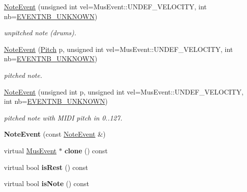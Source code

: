 \begin{DoxyCompactItemize}
\item 
\mbox{\hyperlink{group__segment_gaeeb3a0d391bef4a285f1be45d31e63be}{Note\+Event}} (unsigned int vel=Mus\+Event\+::\+U\+N\+D\+E\+F\+\_\+\+V\+E\+L\+O\+C\+I\+TY, int nb=\mbox{\hyperlink{group__general_gac3b19762b16f33de03662fd4289fe5a9}{E\+V\+E\+N\+T\+N\+B\+\_\+\+U\+N\+K\+N\+O\+WN}})
\begin{DoxyCompactList}\small\item\em unpitched note (drums). \end{DoxyCompactList}\item 
\mbox{\hyperlink{group__segment_ga1bd25b8699a9ed866f11f62a844645f7}{Note\+Event}} (\mbox{\hyperlink{classPitch}{Pitch}} p, unsigned int vel=Mus\+Event\+::\+U\+N\+D\+E\+F\+\_\+\+V\+E\+L\+O\+C\+I\+TY, int nb=\mbox{\hyperlink{group__general_gac3b19762b16f33de03662fd4289fe5a9}{E\+V\+E\+N\+T\+N\+B\+\_\+\+U\+N\+K\+N\+O\+WN}})
\begin{DoxyCompactList}\small\item\em pitched note. \end{DoxyCompactList}\item 
\mbox{\hyperlink{group__segment_ga135e904aa3f5ea4d375e451281fe5323}{Note\+Event}} (unsigned int p, unsigned int vel=Mus\+Event\+::\+U\+N\+D\+E\+F\+\_\+\+V\+E\+L\+O\+C\+I\+TY, int nb=\mbox{\hyperlink{group__general_gac3b19762b16f33de03662fd4289fe5a9}{E\+V\+E\+N\+T\+N\+B\+\_\+\+U\+N\+K\+N\+O\+WN}})
\begin{DoxyCompactList}\small\item\em pitched note with M\+I\+DI pitch in 0..127. \end{DoxyCompactList}\item 
{\bfseries Note\+Event} (const \mbox{\hyperlink{classNoteEvent}{Note\+Event}} \&)
\item 
virtual \mbox{\hyperlink{classMusEvent}{Mus\+Event}} $\ast$ {\bfseries clone} () const
\item 
\mbox{\label{classNoteEvent_afd1615e5f11074184f08946b14232c37}} 
virtual bool {\bfseries is\+Rest} () const
\item 
\mbox{\label{classNoteEvent_aaf40b5c82f0f6517b34ca3e0d89f585a}} 
virtual bool {\bfseries is\+Note} () const
\item 
\mbox{\label{classNoteEvent_a5e8947bdb559558ed1313c02e0bbe834}} 

\end{DoxyCompactItemize}
